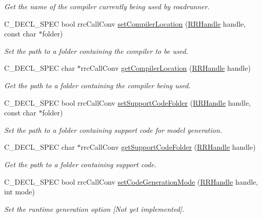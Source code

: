 \begin{DoxyCompactItemize}
\begin{DoxyCompactList}\small\item\em Get the name of the compiler currently being used by roadrunner. \end{DoxyCompactList}\item 
C\+\_\+\+D\+E\+C\+L\+\_\+\+S\+P\+E\+C bool rrc\+Call\+Conv \hyperlink{group__utility_gab910a88973c4f823b1f576c7767cc0d5}{set\+Compiler\+Location} (\hyperlink{rrc__types_8h_a1d68f0592372208fa5a5f2799ea4b3ae}{R\+R\+Handle} handle, const char $\ast$folder)
\begin{DoxyCompactList}\small\item\em Set the path to a folder containing the compiler to be used. \end{DoxyCompactList}\item 
C\+\_\+\+D\+E\+C\+L\+\_\+\+S\+P\+E\+C char $\ast$rrc\+Call\+Conv \hyperlink{group__utility_ga601a1298cfd5bea6847975ddd1ab5a2a}{get\+Compiler\+Location} (\hyperlink{rrc__types_8h_a1d68f0592372208fa5a5f2799ea4b3ae}{R\+R\+Handle} handle)
\begin{DoxyCompactList}\small\item\em Get the path to a folder containing the compiler being used. \end{DoxyCompactList}\item 
C\+\_\+\+D\+E\+C\+L\+\_\+\+S\+P\+E\+C bool rrc\+Call\+Conv \hyperlink{group__utility_ga0d8069e1538d2c41f243e3b6d56abf41}{set\+Support\+Code\+Folder} (\hyperlink{rrc__types_8h_a1d68f0592372208fa5a5f2799ea4b3ae}{R\+R\+Handle} handle, const char $\ast$folder)
\begin{DoxyCompactList}\small\item\em Set the path to a folder containing support code for model generation. \end{DoxyCompactList}\item 
C\+\_\+\+D\+E\+C\+L\+\_\+\+S\+P\+E\+C char $\ast$rrc\+Call\+Conv \hyperlink{group__utility_ga1462be979b060f04caa87394d5a53173}{get\+Support\+Code\+Folder} (\hyperlink{rrc__types_8h_a1d68f0592372208fa5a5f2799ea4b3ae}{R\+R\+Handle} handle)
\begin{DoxyCompactList}\small\item\em Get the path to a folder containing support code. \end{DoxyCompactList}\item 
C\+\_\+\+D\+E\+C\+L\+\_\+\+S\+P\+E\+C bool rrc\+Call\+Conv \hyperlink{group__utility_ga92ba42b5fab8b387744eedd03df10b60}{set\+Code\+Generation\+Mode} (\hyperlink{rrc__types_8h_a1d68f0592372208fa5a5f2799ea4b3ae}{R\+R\+Handle} handle, int mode)
\begin{DoxyCompactList}\small\item\em Set the runtime generation option \mbox{[}Not yet implemented\mbox{]}. \end{DoxyCompactList}\end{DoxyCompactItemize}


